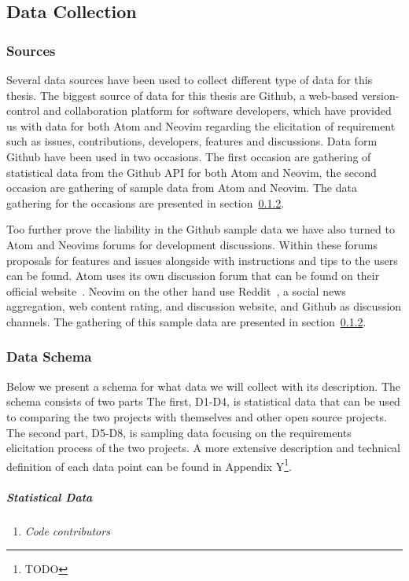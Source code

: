 \documentclass[a4paper,11pt]{article}
\begin{document}
{\subsection{Data Collection}
\subsubsection{Sources}
\label{subsec:sources}
Several data sources have been used to collect different type of data for this thesis. The biggest source of data for this thesis are Github, a web-based version-control and collaboration platform for software developers, which have provided us with data for both Atom and Neovim regarding the elicitation of requirement such as issues, contributions, developers, features and discussions. Data form Github have been used in two occasions. The first occasion are gathering of statistical data from the Github API for both Atom and Neovim, the second occasion are gathering of sample data from Atom and Neovim. The data gathering for the occasions are presented in section~\ref{subsec:data}.

Too further prove the liability in the Github sample data we have also turned to Atom and Neovims forums for development discussions. Within these forums proposals for features and issues alongside with instructions and tips to the users can be found. Atom uses its own discussion forum that can be found on their official website~\cite{atom_wp}. Neovim on the other hand use Reddit~\cite{neovimreddit}, a social news aggregation, web content rating, and discussion website, and Github as discussion channels. The gathering of this sample data are presented in section~\ref{subsec:data}.

\subsubsection{Data Schema}
\label{subsec:data}
Below we present a schema for what data we will collect with its description. The schema consists of two parts The first, D1-D4, is statistical data that can be used to comparing the two projects with themselves and other open source projects. The second part, D5-D8, is sampling data focusing on the requirements elicitation process of the two projects. A more extensive description and technical definition of each data point can be found in Appendix Y\footnote{TODO}.
\subparagraph{Statistical Data}
\begin{enumerate}[label=D\arabic*]
	\item \emph{Code contributors}


\end{enumerate}}
\end{document}
